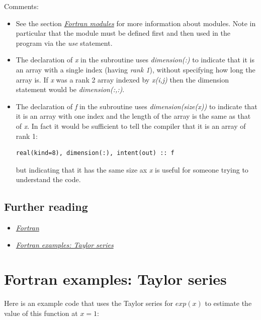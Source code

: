 \documentclass[letterpaper,10pt,english]{sphinxmanual}
\begin{document}
Comments:
\begin{itemize}
\item {} 
See the section {\hyperref[fortran_modules:fortran-modules]{\emph{Fortran modules}}} for more information about modules.
Note in particular that the module must be defined first and then used
in the program via the \emph{use} statement.

\item {} 
The declaration of \emph{x} in the subroutine uses \emph{dimension(:)} to indicate
that it is an array with a single index (having \emph{rank 1}),
without specifying how long the
array is.  If \emph{x} was a rank 2 array indexed by \emph{x(i,j)}
then the dimension statement would be \emph{dimension(:,:)}.

\item {} 
The declaration of \emph{f} in the subroutine uses \emph{dimension(size(x))} to
indicate that it is an array with one index and the length of the array
is the same as that of \emph{x}.  In fact it would be sufficient to tell the
compiler that it is an array of rank 1:

\begin{Verbatim}[commandchars=\\\{\}]
real(kind=8), dimension(:), intent(out) :: f
\end{Verbatim}

but indicating that it has the same size ax \emph{x} is useful for someone
trying to understand the code.

\end{itemize}


\subsection{Further reading}
\label{fortran_sub:further-reading}\begin{itemize}
\item {} 
{\hyperref[fortran:fortran]{\emph{Fortran}}}

\item {} 
{\hyperref[fortran_taylor:fortran-taylor]{\emph{Fortran examples: Taylor series}}}

\end{itemize}


\section{Fortran examples: Taylor series}
\label{fortran_taylor:fortran-taylor}\label{fortran_taylor:fortran-examples-taylor-series}\label{fortran_taylor::doc}
Here is an example code that uses the Taylor series for $exp(x)$ to
estimate the value of this function at $x=1$:
\end{document}
